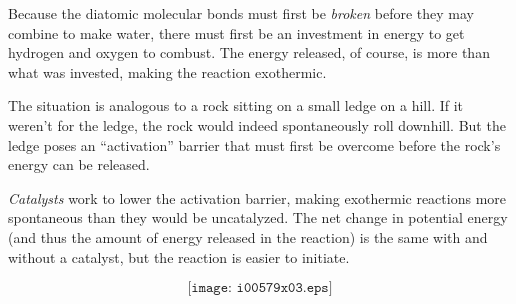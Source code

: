 





Because the diatomic molecular bonds must first be {\it broken} before they may combine to make water, there must first be an investment in energy to get hydrogen and oxygen to combust.  The energy released, of course, is more than what was invested, making the reaction exothermic.

The situation is analogous to a rock sitting on a small ledge on a hill.  If it weren't for the ledge, the rock would indeed spontaneously roll downhill.  But the ledge poses an ``activation'' barrier that must first be overcome before the rock's energy can be released.

{\it Catalysts} work to lower the activation barrier, making exothermic reactions more spontaneous than they would be uncatalyzed.  The net change in potential energy (and thus the amount of energy released in the reaction) is the same with and without a catalyst, but the reaction is easier to initiate.

$$\texttt{[image: i00579x03.eps]}$$




